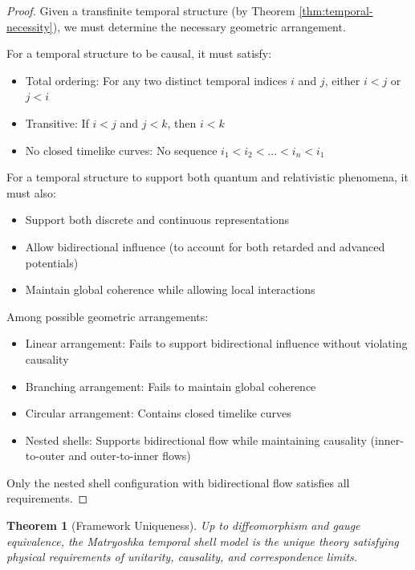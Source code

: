 \documentclass[12pt,a4paper]{article}
\newtheorem{theorem}{Theorem}[section]
\begin{document}
\begin{proof}
Given a transfinite temporal structure (by Theorem \ref{thm:temporal-necessity}), we must determine the necessary geometric arrangement.

For a temporal structure to be causal, it must satisfy:
\begin{itemize}
    \item Total ordering: For any two distinct temporal indices $i$ and $j$, either $i < j$ or $j < i$
    \item Transitive: If $i < j$ and $j < k$, then $i < k$
    \item No closed timelike curves: No sequence $i_1 < i_2 < ... < i_n < i_1$
\end{itemize}

For a temporal structure to support both quantum and relativistic phenomena, it must also:
\begin{itemize}
    \item Support both discrete and continuous representations
    \item Allow bidirectional influence (to account for both retarded and advanced potentials)
    \item Maintain global coherence while allowing local interactions
\end{itemize}

Among possible geometric arrangements:
\begin{itemize}
    \item Linear arrangement: Fails to support bidirectional influence without violating causality
    \item Branching arrangement: Fails to maintain global coherence
    \item Circular arrangement: Contains closed timelike curves
    \item Nested shells: Supports bidirectional flow while maintaining causality (inner-to-outer and outer-to-inner flows)
\end{itemize}

Only the nested shell configuration with bidirectional flow satisfies all requirements.
\end{proof}

\begin{theorem}[Framework Uniqueness]
\label{thm:framework-uniqueness}
Up to diffeomorphism and gauge equivalence, the Matryoshka temporal shell model is the unique theory satisfying physical requirements of unitarity, causality, and correspondence limits.
\end{theorem}
\end{document}
